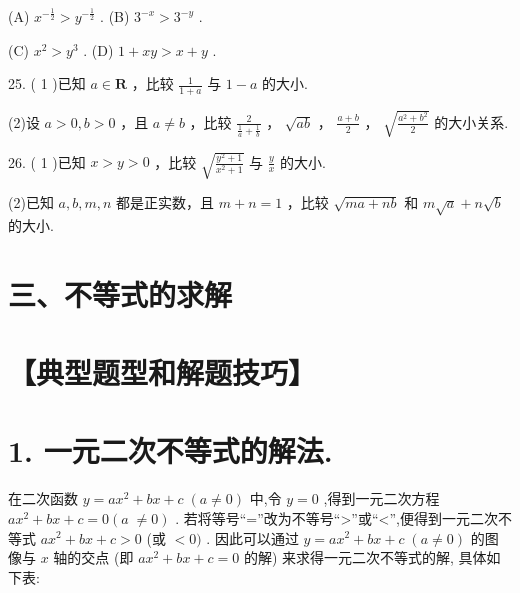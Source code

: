 \documentclass[10pt]{article}
\begin{document}
(A) \({x}^{-\frac{1}{2}} > {y}^{-\frac{1}{2}}\) . (B) \({3}^{-x} > {3}^{-y}\) .

(C) \({x}^{2} > {y}^{3}\) . (D) \(1 + {xy} > x + y\) .

25. ( 1 )已知 \(a \in  \mathbf{R}\) ，比较 \(\frac{1}{1 + a}\) 与 \(1 - a\) 的大小.

(2)设 \(a > 0,b > 0\) ，且 \(a \neq  b\) ，比较 \(\frac{2}{\frac{1}{a} + \frac{1}{b}}\) ， \(\sqrt{ab}\) ， \(\frac{a + b}{2}\) ， \(\sqrt{\frac{{a}^{2} + {b}^{2}}{2}}\) 的大小关系.

26. ( 1 )已知 \(x > y > 0\) ，比较 \(\sqrt{\frac{{y}^{2} + 1}{{x}^{2} + 1}}\) 与 \(\frac{y}{x}\) 的大小.

(2)已知 \(a,b,m,n\) 都是正实数，且 \(m + n = 1\) ，比较 \(\sqrt{{ma} + {nb}}\) 和 \(m\sqrt{a} + n\sqrt{b}\) 的大小.

\section*{三、不等式的求解}

\section*{【典型题型和解题技巧】}

\section*{1. 一元二次不等式的解法.}

在二次函数 \(y = a{x}^{2} + {bx} + c\;\left( {a \neq  0}\right)\) 中,令 \(y = 0\) ,得到一元二次方程 \(a{x}^{2} + {bx} + c = 0(a \; \neq  0)\) . 若将等号“=”改为不等号“>”或“<”,便得到一元二次不等式 \(a{x}^{2} + {bx} + c > 0\) (或 \(< 0)\) . 因此可以通过 \(y = a{x}^{2} + {bx} + c\;\left( {a \neq  0}\right)\) 的图像与 \(x\) 轴的交点 (即 \(a{x}^{2} + {bx} + c = 0\) 的解) 来求得一元二次不等式的解, 具体如下表:
\end{document}
